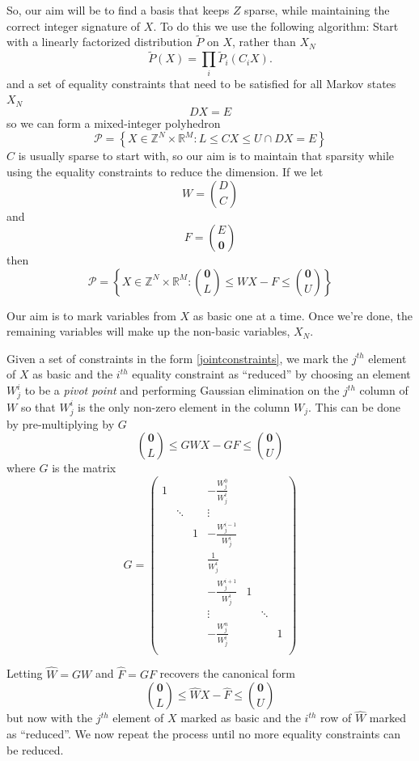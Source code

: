 \documentclass{article}
\begin{document}
So, our aim will be to find a basis that keeps $Z$ sparse, while maintaining the correct integer signature of $X$. To do this we use the following algorithm: Start with a linearly factorized distribution $\tilde{P}$ on $X$, rather than $X_N$
\[
\tilde{P}(X) = \prod_i \tilde{P}_i(C_iX).
\]
and a set of equality constraints that need to be satisfied for all Markov states $X_N$
\[
DX = E
\]
so we can form a mixed-integer polyhedron
\[
\mathcal{P} = \left\{X \in \mathbb{Z}^N \times \mathbb{R}^M: L \le CX \le U \cap DX = E \right\}
\]
$C$ is usually sparse to start with, so our aim is to maintain that sparsity while using the equality constraints to reduce the dimension. If we let
\[
W= {D \choose C}
\]
and
\[
F = {E \choose \mathbf{0}}
\]
then
\begin{equation}
\mathcal{P} = \left\{X \in \mathbb{Z}^N \times \mathbb{R}^M: {\mathbf{0} \choose L} \le W X - F \le {\mathbf{0} \choose U} \right\}
\label{jointconstraints}
\end{equation}

Our aim is to mark variables from $X$ as basic one at a time. Once we're done, the remaining variables will make up the non-basic variables, $X_N$.

Given a set of constraints in the form \eqref{jointconstraints}, we mark the $j^{th}$ element of $X$ as basic and the $i^{th}$ equality constraint as ``reduced'' by choosing an element $W^i_j$ to be a \textit{pivot point} and performing Gaussian elimination on the $j^{th}$ column of $W$ so that $W^i_j$ is the only non-zero element in the column $W_j$. This can be done by pre-multiplying by $G$
\[
{\mathbf{0} \choose L} \le GWX - GF \le {\mathbf{0} \choose U}
\]
where $G$ is the matrix
\[
G =  
\begin{pmatrix}
1 &  & &-\frac{W^0_j}{W^i_j} & & &\\
& \ddots & &\vdots & & &\\
& & 1 & -\frac{W^{i-1}_j}{W^i_j} & & &\\
& & & \frac{1}{W^i_j} & & &\\
& &  & -\frac{W^{i+1}_j}{W^i_j} & 1 & &\\
& & & \vdots & & \ddots &\\
& & & -\frac{W^n_j}{W^i_j} & & &1\\
\end{pmatrix}
\]

Letting $\hat{W} = GW$ and $\hat{F} = GF$ recovers the canonical form
\begin{equation}
{\mathbf{0} \choose L} \le \hat{W}X - \hat{F} \le {\mathbf{0} \choose U}
\label{eliminatedConstraint}
\end{equation}
but now with the $j^{th}$ element of $X$ marked as basic and the $i^{th}$ row of $\hat{W}$ marked as ``reduced''. We now repeat the process until no more equality constraints can be reduced.
\end{document}
